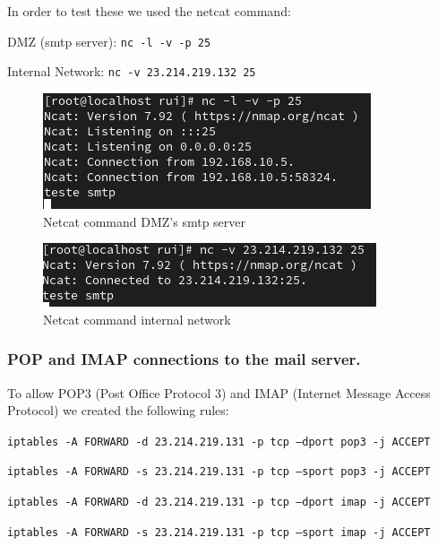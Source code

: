 \documentclass{article}
\begin{document}
In order to test these we used the netcat command:
\texttt{}\par
\texttt{}\par
DMZ (smtp server): \texttt{nc -l -v -p 25} \par
Internal Network: \texttt{nc -v 23.214.219.132 25} \par
\texttt{}\par
\begin{figure}[H]
    \centering
    \includegraphics[scale=0.5]{btw/btw_smtp_dmz.png}
    \caption{Netcat command DMZ's smtp server}
    \label{fig:network-arc}
\end{figure}

\begin{figure}[H]
    \centering
    \includegraphics[scale=0.5]{btw/btw_smtp_internal.png}
    \caption{Netcat command internal network}
    \label{fig:network-arc}
\end{figure}

\subsubsection{POP and IMAP connections to the mail server.}
\texttt{}\par 
To allow POP3 (Post Office Protocol 3) and IMAP (Internet Message Access Protocol)  we created the following rules:

\texttt{}\par
\texttt{iptables -A FORWARD -d 23.214.219.131 -p tcp --dport pop3 -j ACCEPT}\par
\texttt{iptables -A FORWARD -s 23.214.219.131 -p tcp --sport pop3 -j ACCEPT}\par
\texttt{}\par
\texttt{}\par
\texttt{iptables -A FORWARD -d 23.214.219.131 -p tcp --dport imap -j ACCEPT}\par
\texttt{iptables -A FORWARD -s 23.214.219.131 -p tcp --sport imap -j ACCEPT}\par
\texttt{}\par
\end{document}
